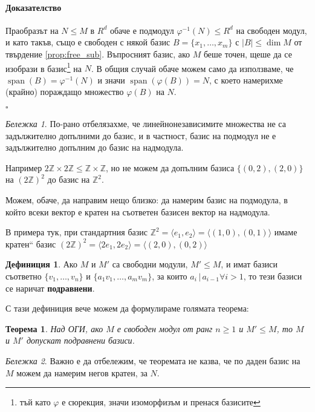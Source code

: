 \documentclass{article}
\newif\ifusemulticols
\newcommand\newterm[1]{\textbf{#1}}
\theoremstyle{definition}
\newtheorem{deff}{Дефиниция}
\theoremstyle{remark}
\newtheorem*{note}{Бележка}
\theoremstyle{plain}
\newtheorem{theorem}{Теорема}
\theoremstyle{plain}
\newenvironment{mymulticols}
    { \ifusemulticols \begin{multicols}{2} \fi }
    { \ifusemulticols \end{multicols} \fi }
\newenvironment{myproof}{\paragraph{Доказателство}}{\hfill$\square$}
\DeclareMathOperator{\vecspan}{span}
\newcommand{\Z}{\mathbb{Z}}
\begin{document}
\begin{mymulticols}
\begin{myproof}
    Праобразът на $N \le M$ в $R^d$ обаче е подмодул $\varphi^{-1}(N) \le R^d$ на свободен модул, и
    като такъв, също е свободен с някой базис $B = \{x_1,\ldots,x_m\}$ с $|B| \le \dim M$ от
    твърдение \ref{prop:free_sub}.
    Въпросният базис, ако $M$ беше точен, щеше да се изобрази в базис\footnote{тъй като $\varphi$ е
    сюрекция, значи изоморфизъм и пренася базисите} на $N$.
    В общия случай обаче можем само да използваме, че $\vecspan(B) = \varphi^{-1}(N)$ и значи
    $\vecspan(\varphi(B)) = N$, с което намерихме (крайно) пораждащо множество $\varphi(B)$ на $N$.

\end{myproof}

\begin{note}
    По-рано отбелязахме, че линейнонезависимите множества не са задължително допълними до базис, и
    в частност, базис на подмодул не е задължително допълним до базис на надмодула.

    Например $2\Z \times 2\Z \le \Z \times \Z$, но не можем да допълним базиса $\{(0, 2), (2, 0)\}$
    на $(2\Z) ^2$ до базис на $\Z^2$.

    Можем, обаче, да направим нещо близко: да намерим базис на подмодула, в който всеки вектор е
    кратен на съответен базисен вектор на надмодула.

    В примера тук, при стандартния базис $\Z^2 = \langle e_1, e_2 \rangle = \langle (1,0),(0,1)
    \rangle$ имаме \quotedblbase кратен`` базис $(2\Z)^2 = \langle 2e_1, 2e_2 \rangle = \langle (2,0), (0,2)
    \rangle$
\end{note}

\begin{deff}
    Ако $M$ и $M'$ са свободни модули, $M'\le M$, и имат базиси съответно $\{v_1,\ldots,v_n\}$
    и $\{a_1v_1,\ldots,a_mv_m\}$, за които $a_i \,|\, a_{i-1} \forall i>1$,
    то тези базиси се наричат \newterm{подравнени}.
\end{deff}

С тази дефиниция вече можем да формулираме голямата теорема:

\begin{theorem}
    \label{prop:aligned_bases}
    Над ОГИ, ако $M$ е свободен модул от ранг $n \ge 1$ и $M' \le M$, то $M$ и $M'$ допускат
    подравнени базиси.
\end{theorem}

\begin{note}
    Важно е да отбележим, че теоремата не казва, че по даден базис на $M$ можем да намерим
    негов кратен, за $N$.


\end{note}
\end{mymulticols}
\end{document}
